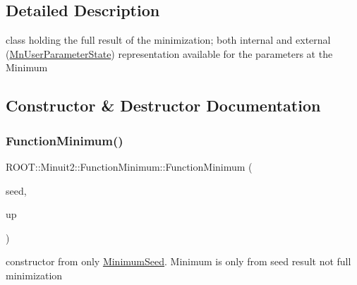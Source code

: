 \subsection{Detailed Description}
class holding the full result of the minimization; both internal and external (\mbox{\hyperlink{classROOT_1_1Minuit2_1_1MnUserParameterState}{Mn\+User\+Parameter\+State}}) representation available for the parameters at the Minimum 

\subsection{Constructor \& Destructor Documentation}
\mbox{\label{classROOT_1_1Minuit2_1_1FunctionMinimum_a907871106f0be755404d80f32fbe2041}} 
\subsubsection{\texorpdfstring{FunctionMinimum()}{FunctionMinimum()}\hspace{0.1cm}{\footnotesize\ttfamily [1/15]}}
{\footnotesize\ttfamily R\+O\+O\+T\+::\+Minuit2\+::\+Function\+Minimum\+::\+Function\+Minimum (\begin{DoxyParamCaption}\item[{const \mbox{\hyperlink{classROOT_1_1Minuit2_1_1MinimumSeed}{Minimum\+Seed}} \&}]{seed,  }\item[{double}]{up }\end{DoxyParamCaption})\hspace{0.3cm}{\ttfamily [inline]}}



constructor from only \mbox{\hyperlink{classROOT_1_1Minuit2_1_1MinimumSeed}{Minimum\+Seed}}. Minimum is only from seed result not full minimization 

\mbox{\label{classROOT_1_1Minuit2_1_1FunctionMinimum_a0d5de11a4f528f8c0a0d061dbcf3e91e}} 
